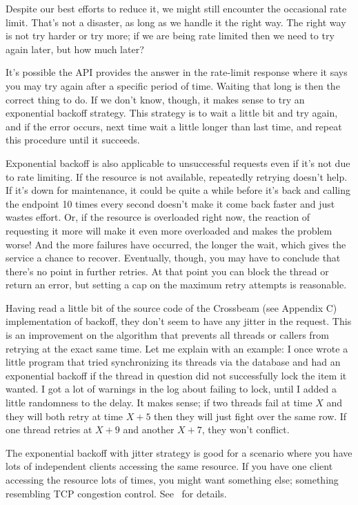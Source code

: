 Despite our best efforts to reduce it, we might still encounter the occasional rate limit. That's not a disaster, as long as we handle it the right way. The right way is not try harder or try more; if we are being rate limited then we need to try again later, but how much later?

It's possible the API provides the answer in the rate-limit response where it says you may try again after a specific period of time. Waiting that long is then the correct thing to do. If we don't know, though, it makes sense to try an exponential backoff strategy. This strategy is to wait a little bit and try again, and if the error occurs, next time wait a little longer than last time, and repeat this procedure until it succeeds.

Exponential backoff is also applicable to unsuccessful requests even if it's not due to rate limiting. If the resource is not available, repeatedly retrying doesn't help. If it's down for maintenance, it could be quite a while before it's back and calling the endpoint 10 times every second doesn't make it come back faster and just wastes effort. Or, if the resource is overloaded right now, the reaction of requesting it more will make it even more overloaded and makes the problem worse! And the more failures have occurred, the longer the wait, which gives the service a chance to recover. Eventually, though, you may have to conclude that there's no point in further retries. At that point you can block the thread or return an error, but setting a cap on the maximum retry attempts is reasonable.

Having read a little bit of the source code of the Crossbeam (see Appendix C) implementation of backoff,  they don't seem to have any jitter in the request. This is an improvement on the algorithm that prevents all threads or callers from retrying at the exact same time. Let me explain with an example: I once wrote a little program that tried synchronizing its threads via the database and had an exponential backoff if the thread in question did not successfully lock the item it wanted. I got a lot of warnings in the log about failing to lock, until I added a little randomness to the delay. It makes sense; if two threads fail at time $X$ and they will both retry at time $X+5$ then they will just fight over the same row. If one thread retries at $X+9$ and another $X+7$, they won't conflict. %

The exponential backoff with jitter strategy is good for a scenario where you have lots of independent clients accessing the same resource. If you have one client accessing the resource lots of times, you might want something else; something resembling TCP congestion control. See~\cite{expbackoff} for details. 





